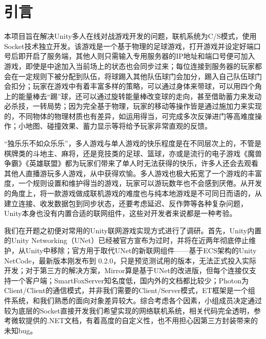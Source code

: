\documentclass[conference]{IEEEtran}
\begin{document}





\begin{abstract}
论文摘要是对文章内容不加诠释和评论的简单陈述。一般控制在 200 字左右，建议在论文全部完成后再动手写摘要。
\end{abstract}


\section{引言}

本项目旨在解决Unity多人在线对战游戏开发的问题，联机系统为C/S模式，使用Socket技术独立开发。该游戏是一个基于物理的足球游戏，打开游戏并设定好端口号后即开启了服务端，其他人则只需输入专用服务器的IP地址和端口号便可加入游戏，即使是中途加入当前场上的状态也会同步过来；每位连接到服务器的玩家都会在一定规则下被分配到队伍，将球踢入其他队伍球门会加分，踢入自己队伍球门会扣分；玩家在游戏中有着丰富多样的策略，可以通过身体来带球，可以用四个角上的能量棒去“踢”球，还可以通过旋转能量棒改变球的走向，甚至借助蓄力来发动必杀技，一转局势；因为完全基于物理，玩家的移动等操作皆是通过施加力来实现的，不同物体的物理材质也有差异，如运用得当，可完成多次反弹进门等高难度操作；小地图、碰撞效果、蓄力显示等将给予玩家非常直观的反馈。

“独乐乐不如众乐乐”，多人游戏与单人游戏的快乐程度是在不同层次上的，不管是棋牌类的斗地主、麻将，还是竞技类的足球、篮球，亦或是流行的电子游戏《魔兽争霸》《英雄联盟》都为玩家们带来了单人时无法获得的快乐，许多人还会去观看其他人直播游玩多人游戏，从中获得欢愉。多人游戏也极大拓宽了一个游戏的丰富度，一个规则设置和维护得当的游戏，玩家可以游玩数年也不会感到厌倦。从开发的角度上，将一款游戏做成联机游戏的难度也与纯本地游戏是不可同日而语的，从建立连接、收发数据包到同步状态，还要考虑延迟、反作弊等各种复杂问题，Unity本身也没有内置合适的联网组件，这些对开发者来说都是一种考验。

我们在开题之初便对常用的Unity联网游戏实现方式进行了调研。首先，Unity内置的Unity Networking（UNet）已经被官方宣布为过时，并将在近两年彻底停止维护，从Unity中移除\cite{UNet过时}；官方用于取代UNet的新联网组件——基于ECS架构的Unity NetCode，最新版本刚发布到 0.2.0，只是预览测试用的版本，无法正式投入实际开发；对于第三方的解决方案，Mirror算是基于UNet的改进版，但每个连接仅支持一个客户端；SmartFoxServer知名度低，国内外的文档都比较少；Photon为Client/Client的通信模式，并非我们需要的Client/Server模式\cite{优缺点比较}，ET框架是一个组件系统，和我们熟悉的面向对象差异较大。综合考虑各个因素，小组成员决定通过较为底层的Socket直接开发我们希望实现的网络联机系统，相关代码完全透明，参考微软提供的.NET文档，有着高度的自定义性，也不用担心因第三方封装带来的未知bug。
\end{document}
